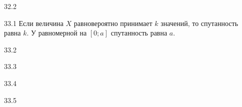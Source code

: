 \protect \hypertarget {soln:32.2}{}
\begin{solution}{{32.2}}
\end{solution}
\protect \hypertarget {soln:33.1}{}
\begin{solution}{{33.1}}
  Если величина $X$ равновероятно принимает $k$ значений, то спутанность равна $k$. У равномерной на $[0;a]$ спутанность равна $a$.
\end{solution}
\protect \hypertarget {soln:33.2}{}
\begin{solution}{{33.2}}
\end{solution}
\protect \hypertarget {soln:33.3}{}
\begin{solution}{{33.3}}
\end{solution}
\protect \hypertarget {soln:33.4}{}
\begin{solution}{{33.4}}
\end{solution}
\protect \hypertarget {soln:33.5}{}
\begin{solution}{{33.5}}
\end{solution}
